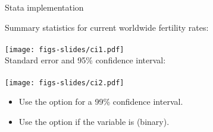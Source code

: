 \documentclass{beamer}
\begin{document}
	\begin{frame}[t]{Stata implementation}
			
	
	Summary statistics for current worldwide fertility rates:\\
	\\[1em]
	
	\texttt{[image: figs-slides/ci1.pdf]}\\[1em]
	


	Standard error and 95\% confidence interval:\\
	\\[1em]
	
	\texttt{[image: figs-slides/ci2.pdf]}\\[1em]
	
	\begin{itemize}
		\item Use the  option for a  99\% confidence interval.
		\item Use the  option if the variable is  (binary).
	\end{itemize}	
	\end{frame}
\end{document}
